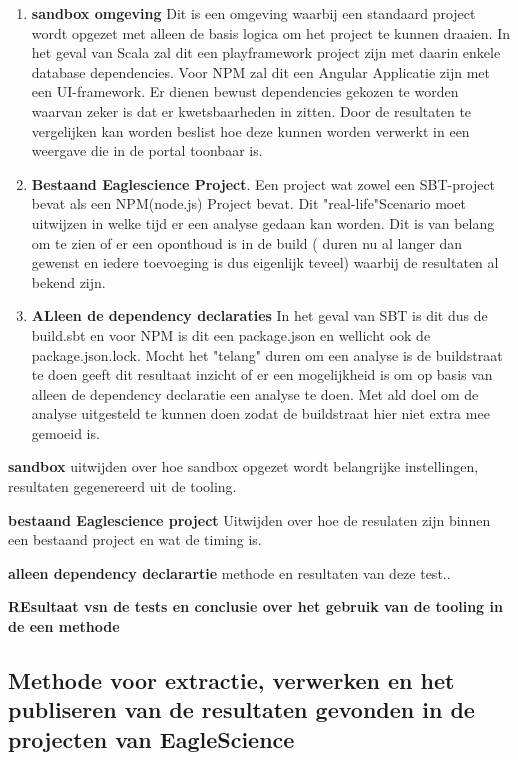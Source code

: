 \begin{enumerate}
    \item \textbf{sandbox omgeving} Dit is een omgeving waarbij een standaard project wordt opgezet met alleen de basis logica om het project te kunnen draaien. In het geval van Scala zal dit een playframework project zijn met daarin enkele database dependencies. Voor NPM zal dit een Angular Applicatie zijn met een UI-framework. Er dienen bewust dependencies gekozen te worden waarvan zeker is dat er kwetsbaarheden in zitten. Door de resultaten te vergelijken kan worden beslist hoe deze kunnen worden verwerkt in een weergave die in de portal toonbaar is.
    \item \textbf{Bestaand Eaglescience Project}. Een project wat zowel een SBT-project bevat als een NPM(node.js) Project bevat. Dit "real-life"Scenario moet uitwijzen in welke tijd er een analyse gedaan kan worden. Dit is van belang om te zien of er een oponthoud is in de build ( duren nu al langer dan gewenst en iedere toevoeging is dus eigenlijk teveel) waarbij de resultaten al bekend zijn.
    \item \textbf{ALleen de dependency declaraties} In het geval van SBT is dit dus de build.sbt en voor NPM is dit  een package.json en wellicht ook de package.json.lock. Mocht het "telang" duren om een analyse is de buildstraat te doen geeft dit resultaat inzicht of er een mogelijkheid is om op basis van alleen de dependency declaratie een analyse te doen. Met ald doel om de analyse uitgesteld te kunnen doen zodat de buildstraat hier niet extra mee gemoeid is.
\end{enumerate}

\textbf{sandbox} uitwijden over hoe sandbox opgezet wordt belangrijke instellingen, resultaten gegenereerd uit de tooling.

\textbf{bestaand Eaglescience project} Uitwijden over hoe de resulaten zijn binnen een bestaand project en wat de timing is.

\textbf{alleen dependency declarartie} methode en resultaten van deze test..


\textbf{REsultaat vsn de tests en conclusie over het gebruik van de tooling in de een methode}



\subsection{Methode voor extractie, verwerken en het publiseren van de resultaten gevonden in de projecten van EagleScience}\label{sec:methodeSOUPES}

